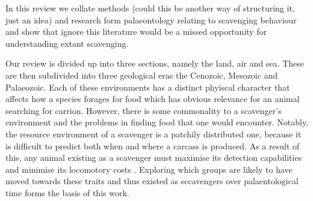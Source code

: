 \documentclass[a4paper,12pt]{article}
\begin{document}
In this review we collate methods (could this be another way of structuring it, just an idea) and research form palaeontology relating to scavenging behaviour and show that ignore this literature would be a missed opportunity for understanding extant scavenging.


Our review is divided up into three sections, namely the land, air and sea. 
These are then subdivided into three geological eras the Cenozoic, Mesozoic and Palaeozoic. 
Each of these environments has a distinct phyiscal character that affects how a species forages for food which has obvious relevance for an animal searching for carrion.  
However, there is some commonality to a scavenger's environment and the problems in finding food that one would encounter. 
Notably, the resource environment of a scavenger is a patchily distributed one, because it is difficult to predict both when and where a carcass is produced. 
As a result of this, any animal existing as a scavenger must maximise its detection capabilities and minimise its locomotory costs \citep{ruxton2004obligate}.
Exploring which groups are likely to have moved towards these traits and thus existed as sccavengers over palaentological time forms the basis of this work.
\end{document}
